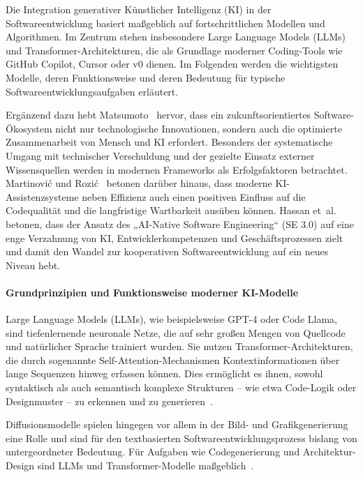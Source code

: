 Die Integration generativer Künstlicher Intelligenz (KI) in der
Softwareentwicklung basiert maßgeblich auf fortschrittlichen Modellen und
Algorithmen. Im Zentrum stehen insbesondere Large Language Models (LLMs) und
Transformer-Architekturen, die als Grundlage moderner Coding-Tools wie GitHub
Copilot, Cursor oder v0 dienen. Im Folgenden werden die wichtigsten Modelle,
deren Funktionsweise und deren Bedeutung für typische
Softwareentwicklungsaufgaben erläutert.

Ergänzend dazu hebt Matsumoto~\cite{matsumoto_conceptual_2021} hervor, dass ein
zukunftsorientiertes Software-Ökosystem nicht nur technologische Innovationen,
sondern auch die optimierte Zusammenarbeit von Mensch und KI erfordert.
Besonders der systematische Umgang mit technischer Verschuldung und der
gezielte Einsatz externer Wissensquellen werden in modernen Frameworks als
Erfolgsfaktoren betrachtet. Martinović und Rozić~\cite{martinovic_impact_2024}
betonen darüber hinaus, dass moderne KI-Assistenzsysteme neben Effizienz auch
einen positiven Einfluss auf die Codequalität und die langfristige Wartbarkeit
ausüben können. Hassan et~al.~\cite{hassan_towards_2024} betonen, dass der
Ansatz des „AI-Native Software Engineering“ (SE 3.0) auf eine enge Verzahnung
von KI, Entwicklerkompetenzen und Geschäftsprozessen zielt und damit den Wandel
zur kooperativen Softwareentwicklung auf ein neues Niveau hebt.

\paragraph{Grundprinzipien und Funktionsweise moderner KI-Modelle}

Large Language Models (LLMs), wie beispielsweise GPT-4 oder Code Llama, sind
tiefenlernende neuronale Netze, die auf sehr großen Mengen von Quellcode und
natürlicher Sprache trainiert wurden. Sie nutzen Transformer-Architekturen, die
durch sogenannte Self-Attention-Mechanismen Kontextinformationen über lange
Sequenzen hinweg erfassen können. Dies ermöglicht es ihnen, sowohl syntaktisch
als auch semantisch komplexe Strukturen – wie etwa Code-Logik oder Designmuster
– zu erkennen und zu generieren~\cite{nguyen-duc_generative_2023,
    esposito_generative_2025}.

Diffusionsmodelle spielen hingegen vor allem in der Bild- und Grafikgenerierung
eine Rolle und sind für den textbasierten Softwareentwicklungsprozess bislang
von untergeordneter Bedeutung. Für Aufgaben wie Codegenerierung und
Architektur-Design sind LLMs und Transformer-Modelle
maßgeblich~\cite{weisz_design_2024}.

